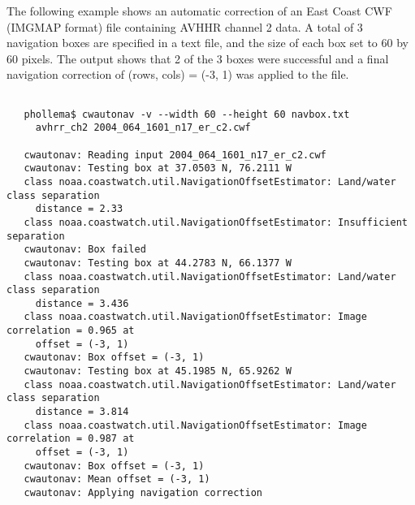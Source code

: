  The following example shows an automatic correction of an East Coast CWF (IMGMAP format) file containing AVHHR channel 2 data. A total of 3 navigation boxes are specified in a text file, and the size of each box set to 60 by 60 pixels. The output shows that 2 of the 3 boxes were successful and a final navigation correction of (rows, cols) = (-3, 1) was applied to the file.
\begin{verbatim}

   phollema$ cwautonav -v --width 60 --height 60 navbox.txt 
     avhrr_ch2 2004_064_1601_n17_er_c2.cwf

   cwautonav: Reading input 2004_064_1601_n17_er_c2.cwf
   cwautonav: Testing box at 37.0503 N, 76.2111 W
   class noaa.coastwatch.util.NavigationOffsetEstimator: Land/water class separation 
     distance = 2.33
   class noaa.coastwatch.util.NavigationOffsetEstimator: Insufficient separation
   cwautonav: Box failed
   cwautonav: Testing box at 44.2783 N, 66.1377 W
   class noaa.coastwatch.util.NavigationOffsetEstimator: Land/water class separation
     distance = 3.436
   class noaa.coastwatch.util.NavigationOffsetEstimator: Image correlation = 0.965 at
     offset = (-3, 1)
   cwautonav: Box offset = (-3, 1)
   cwautonav: Testing box at 45.1985 N, 65.9262 W
   class noaa.coastwatch.util.NavigationOffsetEstimator: Land/water class separation 
     distance = 3.814
   class noaa.coastwatch.util.NavigationOffsetEstimator: Image correlation = 0.987 at
     offset = (-3, 1)
   cwautonav: Box offset = (-3, 1)
   cwautonav: Mean offset = (-3, 1)
   cwautonav: Applying navigation correction
 
\end{verbatim}


